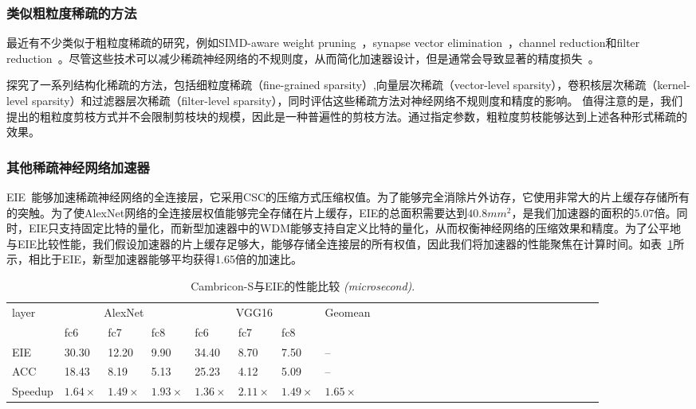 \subsubsection{类似粗粒度稀疏的方法}
最近有不少类似于粗粒度稀疏的研究，例如SIMD-aware weight pruning~\cite{yu2017scalpel}，synapse vector elimination~\cite{hill2017deftnn}，channel reduction和filter reduction~\cite{wen2016learning,lebedev2016fast}。尽管这些技术可以减少稀疏神经网络的不规则度，从而简化加速器设计，但是通常会导致显著的精度损失~\cite{li2016pruning}。

\citet{mao2017exploring}探究了一系列结构化稀疏的方法，包括细粒度稀疏（fine-grained sparsity）,向量层次稀疏（vector-level sparsity），卷积核层次稀疏（kernel-level sparsity）和过滤器层次稀疏（filter-level sparsity），同时评估这些稀疏方法对神经网络不规则度和精度的影响。 值得注意的是，我们提出的粗粒度剪枝方式并不会限制剪枝块的规模，因此是一种普遍性的剪枝方法。通过指定参数，粗粒度剪枝能够达到上述各种形式稀疏的效果。

\subsubsection{其他稀疏神经网络加速器}
EIE~\cite{han2016eie}能够加速稀疏神经网络的全连接层，它采用CSC的压缩方式压缩权值。为了能够完全消除片外访存，它使用非常大的片上缓存存储所有的突触。为了使AlexNet网络的全连接层权值能够完全存储在片上缓存，EIE的总面积需要达到$40.8mm^2$，是我们加速器的面积的5.07倍。同时，EIE只支持固定比特的量化，而新型加速器中的WDM能够支持自定义比特的量化，从而权衡神经网络的压缩效果和精度。为了公平地与EIE比较性能，我们假设加速器的片上缓存足够大，能够存储全连接层的所有权值，因此我们将加速器的性能聚焦在计算时间。如表~\ref{tab:EIE}所示，相比于EIE，新型加速器能够平均获得1.65倍的加速比。

\begin{table}[h]
\centering
\caption{\footnotesize Cambricon-S与EIE的性能比较 \emph{(microsecond)}.}
\label{tab:EIE}
\begin{tabular}{@{}lll@{~~}lll@{~~}lll@{~~}lll@{~~}lll@{~~}lll@{~~}lll@{~~}lllllll}
\toprule
layer & \multicolumn{3}{c}{AlexNet} & \multicolumn{3}{c}{VGG16} & Geomean\\
& fc6 & fc7 & fc8 & fc6 & fc7 & fc8     \\
\midrule
EIE & 30.30 & 12.20 & 9.90  & 34.40 & 8.70  & 7.50  & --\\
ACC & 18.43 & 8.19  & 5.13  & 25.23 & 4.12  & 5.09  & --\\
Speedup & $1.64\times$ & $1.49\times$ & $1.93\times$ & $1.36\times$ & $2.11\times$ & $1.49\times$ & $1.65\times$ \\
\bottomrule
\end{tabular}
\end{table}

